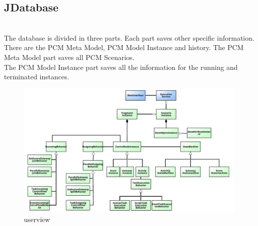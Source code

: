 %
%
\subsection{JDatabase}

\\
The database is divided in three parts. Each part saves other specific information. There are the PCM Meta Model, PCM Model Instance and history. The PCM Meta Model part saves all PCM Scenarios.\\
The PCM Model Instance part saves all the information for the running and terminated instances.

\begin{figure}[h]
\centering
\includegraphics[width=6in]{img/ClassDiagramm.png}
\caption{userview}
\label{fig:userview}
\end{figure}